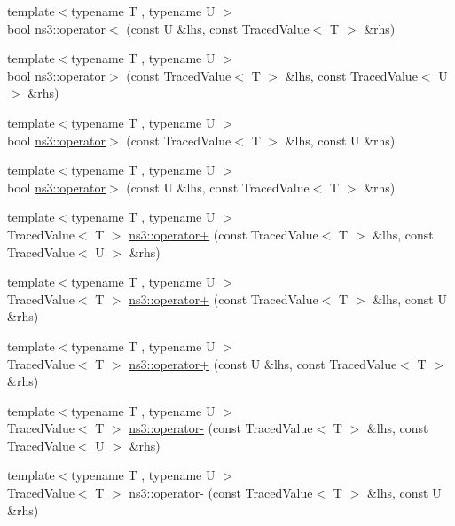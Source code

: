\begin{DoxyCompactItemize}
\item 
{\footnotesize template$<$typename T , typename U $>$ }\\bool \hyperlink{group__tracing_ga0da7f38ad03dddffff29282d4caf13b2}{ns3\+::operator$<$} (const U \&lhs, const Traced\+Value$<$ T $>$ \&rhs)
\item 
{\footnotesize template$<$typename T , typename U $>$ }\\bool \hyperlink{group__tracing_ga7ef2f576a49a90e3302243ae951434b4}{ns3\+::operator$>$} (const Traced\+Value$<$ T $>$ \&lhs, const Traced\+Value$<$ U $>$ \&rhs)
\item 
{\footnotesize template$<$typename T , typename U $>$ }\\bool \hyperlink{group__tracing_ga3f02ac6f8a32bcca7fb2300d363862bd}{ns3\+::operator$>$} (const Traced\+Value$<$ T $>$ \&lhs, const U \&rhs)
\item 
{\footnotesize template$<$typename T , typename U $>$ }\\bool \hyperlink{group__tracing_gabd7685a58b0f7cb7f8f53ef06554828f}{ns3\+::operator$>$} (const U \&lhs, const Traced\+Value$<$ T $>$ \&rhs)
\item 
{\footnotesize template$<$typename T , typename U $>$ }\\Traced\+Value$<$ T $>$ \hyperlink{group__tracing_ga782eccee1c7da9925ce63f8f2d045930}{ns3\+::operator+} (const Traced\+Value$<$ T $>$ \&lhs, const Traced\+Value$<$ U $>$ \&rhs)
\item 
{\footnotesize template$<$typename T , typename U $>$ }\\Traced\+Value$<$ T $>$ \hyperlink{group__tracing_gae790ba5a5fae7b7649946b432498a4cb}{ns3\+::operator+} (const Traced\+Value$<$ T $>$ \&lhs, const U \&rhs)
\item 
{\footnotesize template$<$typename T , typename U $>$ }\\Traced\+Value$<$ T $>$ \hyperlink{group__tracing_ga14b0725265337cb5d0eaa021544c5a65}{ns3\+::operator+} (const U \&lhs, const Traced\+Value$<$ T $>$ \&rhs)
\item 
{\footnotesize template$<$typename T , typename U $>$ }\\Traced\+Value$<$ T $>$ \hyperlink{group__tracing_ga27cee014078fb0a7dad0e83e22d348b8}{ns3\+::operator-\/} (const Traced\+Value$<$ T $>$ \&lhs, const Traced\+Value$<$ U $>$ \&rhs)
\item 
{\footnotesize template$<$typename T , typename U $>$ }\\Traced\+Value$<$ T $>$ \hyperlink{group__tracing_gad41ceb4510644aff80fb16c9ab94a63b}{ns3\+::operator-\/} (const Traced\+Value$<$ T $>$ \&lhs, const U \&rhs)

\end{DoxyCompactItemize}
